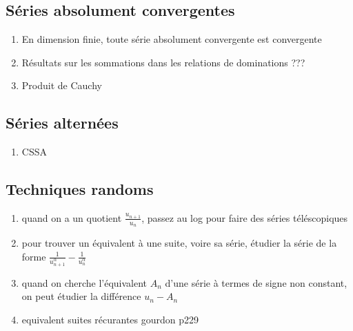 \subsection{Séries absolument convergentes}
\begin{enumerate}
    \item En dimension finie, toute série absolument convergente est convergente
    \item Résultats sur les sommations dans les relations de dominations ???
    \item Produit de Cauchy
\end{enumerate}


\subsection{Séries alternées}
\begin{enumerate}
    \item CSSA
\end{enumerate} 

\subsection{Techniques randoms}
\begin{enumerate}
    \item quand on a un quotient $\frac{u_{n+1}}{u_n}$, passez au log pour faire des séries téléscopiques
    \item pour trouver un équivalent à une suite, voire sa série, étudier la série de la forme $\frac{1}{u_{n+1}^\alpha} - \frac{1}{u_{n}^\alpha}$
    \item quand on cherche l'équivalent $A_n$ d'une série à termes de signe non constant, on peut étudier la différence $u_n - A_n$
    \item equivalent suites récurantes gourdon p229
\end{enumerate}
